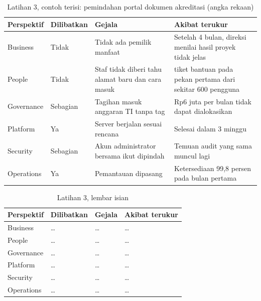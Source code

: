 \begin{table}[!htb]
  \centering
  \footnotesize
  \caption{Latihan 3, contoh terisi: pemindahan portal dokumen akreditasi (angka rekaan)}
  \label{tab:ch04-lat3-contoh}
  \begin{tabularx}{\textwidth}{>{\raggedright\arraybackslash}p{1.7cm}
                               >{\raggedright\arraybackslash}p{1.6cm}
                               >{\raggedright\arraybackslash}X
                               >{\raggedright\arraybackslash}X}
    \hline
    \textbf{Perspektif} & \textbf{Dilibatkan} & \textbf{Gejala} & \textbf{Akibat terukur} \\
    \hline
    Business & Tidak & Tidak ada pemilik manfaat & Setelah 4 bulan, direksi menilai hasil
      proyek tidak jelas \\
    \hline
    People & Tidak & Staf tidak diberi tahu alamat baru dan cara masuk & 212 tiket bantuan
      pada pekan pertama dari sekitar 600 pengguna \\
    \hline
    Governance & Sebagian & Tagihan masuk anggaran TI tanpa tag & Rp6 juta per bulan tidak
      dapat dialokasikan \\
    \hline
    Platform & Ya & Server berjalan sesuai rencana & Selesai dalam 3 minggu \\
    \hline
    Security & Sebagian & Akun administrator bersama ikut dipindah & Temuan audit yang sama
      muncul lagi \\
    \hline
    Operations & Ya & Pemantauan dipasang & Ketersediaan 99,8 persen pada bulan pertama \\
    \hline
  \end{tabularx}
\end{table}

\begin{table}[!htb]
  \centering
  \footnotesize
  \caption{Latihan 3, lembar isian}
  \label{tab:ch04-lat3-hasil}
  \begin{tabularx}{\textwidth}{>{\raggedright\arraybackslash}p{1.7cm}
                               >{\raggedright\arraybackslash}p{1.6cm}
                               >{\raggedright\arraybackslash}X
                               >{\raggedright\arraybackslash}X}
    \hline
    \textbf{Perspektif} & \textbf{Dilibatkan} & \textbf{Gejala} & \textbf{Akibat terukur} \\
    \hline
    Business & \dots & \dots & \dots \\
    \hline
    People & \dots & \dots & \dots \\
    \hline
    Governance & \dots & \dots & \dots \\
    \hline
    Platform & \dots & \dots & \dots \\
    \hline
    Security & \dots & \dots & \dots \\
    \hline
    Operations & \dots & \dots & \dots \\
    \hline
  \end{tabularx}
\end{table}

